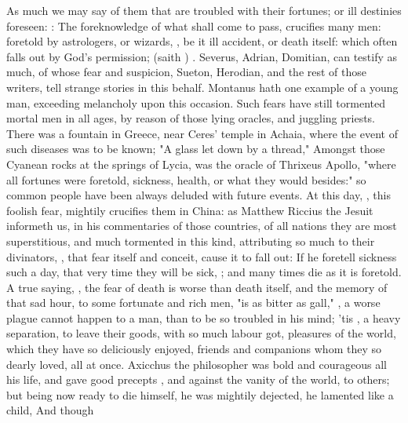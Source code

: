 As much we may say of them that are troubled with their fortunes; or ill
destinies foreseen: : The foreknowledge of
what shall come to pass, crucifies many men: foretold by astrologers, or
wizards, , be it ill accident, or death itself: which
often falls out by God's permission;  (saith
\Chrysostom{}) . Severus, Adrian, Domitian, can
testify as much, of whose fear and suspicion, Sueton, Herodian, and the rest of
those writers, tell strange stories in this behalf.
Montanus  hath one
example of a young man, exceeding melancholy upon this occasion. Such fears
have still tormented mortal men in all ages, by reason of those lying oracles,
and juggling priests. There was a fountain in Greece, near
Ceres' temple in Achaia, where the event of such diseases was to be known; "A
glass let down by a thread," \etc{} Amongst those Cyanean rocks at the springs
of Lycia, was the oracle of Thrixeus Apollo, "where all fortunes were foretold,
sickness, health, or what they would besides:" so common people have been
always deluded with future events. At this day, , this foolish fear, mightily crucifies them in China: as
Matthew Riccius the Jesuit informeth us, in his
commentaries of those countries, of all nations they are most superstitious,
and much tormented in this kind, attributing so much to their divinators,
, that fear itself and conceit, cause it to
fall out: If he foretell sickness such a day, that very
time they will be sick, ; and many
times die as it is foretold. A true saying, , the
fear of death is worse than death itself, and the memory of that sad hour, to
some fortunate and rich men, "is as bitter as gall,"  , a worse plague cannot happen
to a man, than to be so troubled in his mind; 'tis , a
heavy separation, to leave their goods, with so much labour got, pleasures of
the world, which they have so deliciously enjoyed, friends and companions whom
they so dearly loved, all at once. Axicchus the philosopher was bold and
courageous all his life, and gave good precepts , and
against the vanity of the world, to others; but being now ready to die himself,
he was mightily dejected,  he lamented like a child, \etc{} And though
